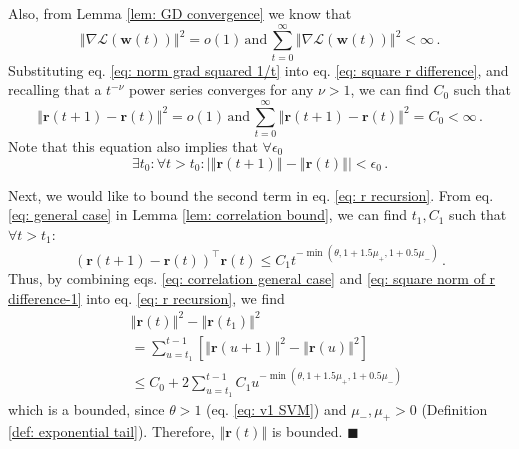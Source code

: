 \documentclass[twoside,11pt,english]{article}
\begin{document}
Also, from Lemma \ref{lem: GD convergence} we know that 
\begin{equation}
\left\Vert \nabla\mathcal{L}\left(\mathbf{w}\left(t\right)\right)\right\Vert ^{2}=o\left(1\right)\,\mathrm{and}\,\sum_{t=0}^{\infty}\left\Vert \nabla\mathcal{L}\left(\mathbf{w}\left(t\right)\right)\right\Vert ^{2}<\infty\,.\label{eq: norm grad squared 1/t}
\end{equation}
Substituting eq. \ref{eq: norm grad squared 1/t} into eq. \ref{eq: square r difference},
and recalling that a $t^{-\nu}$ power series converges for any $\nu>1$,
we can find $C_{0}$ such that 
\begin{equation}
\left\Vert \mathbf{r}\left(t+1\right)-\mathbf{r}\left(t\right)\right\Vert ^{2}=o\left(1\right)\,\mathrm{and}\,\sum_{t=0}^{\infty}\left\Vert \mathbf{r}\left(t+1\right)-\mathbf{r}\left(t\right)\right\Vert ^{2}=C_{0}<\infty\,.\label{eq: square norm of r difference-1}
\end{equation}
Note that this equation also implies that $\forall\epsilon_{0}$ 
\begin{equation}
\exists t_{0}:\forall t>t_{0}:\left|\left\Vert \mathbf{r}\left(t+1\right)\right\Vert -\left\Vert \mathbf{r}\left(t\right)\right\Vert \right|<\epsilon_{0}\,.\label{eq: norm difference convergence}
\end{equation}

Next, we would like to bound the second term in eq. \ref{eq: r recursion}.
From eq. \ref{eq: general case} in Lemma \ref{lem: correlation bound},
we can find $t_{1},C_{1}$ such that $\forall t>t_{1}$: 
\begin{equation}
\left(\mathbf{r}\left(t+1\right)-\mathbf{r}\left(t\right)\right)^{\top}\mathbf{r}\left(t\right)\leq C_{1}t^{-\min\left(\theta,1+1.5\mu_{+},1+0.5\mu_{-}\right)}\,.\label{eq: correlation general case}
\end{equation}
Thus, by combining eqs. \ref{eq: correlation general case} and \ref{eq: square norm of r difference-1}
into eq. \ref{eq: r recursion}, we find 
\begin{align*}
\, & \left\Vert \mathbf{r}\left(t\right)\right\Vert ^{2}-\left\Vert \mathbf{r}\left(t_{1}\right)\right\Vert ^{2}\\
 & =\sum_{u=t_{1}}^{t-1}\left[\left\Vert \mathbf{r}\left(u+1\right)\right\Vert ^{2}-\left\Vert \mathbf{r}\left(u\right)\right\Vert ^{2}\right]\\
 & \leq C_{0}+2\sum_{u=t_{1}}^{t-1}C_{1}u^{-\min\left(\theta,1+1.5\mu_{+},1+0.5\mu_{-}\right)}
\end{align*}
which is a bounded, since $\theta>1$ (eq. \ref{eq: v1 SVM}) and $\mu_-,\mu_+>0$ (Definition \ref{def: exponential tail}). Therefore,
$\left\Vert \mathbf{r}\left(t\right)\right\Vert $ is bounded. $\blacksquare$
\end{document}
